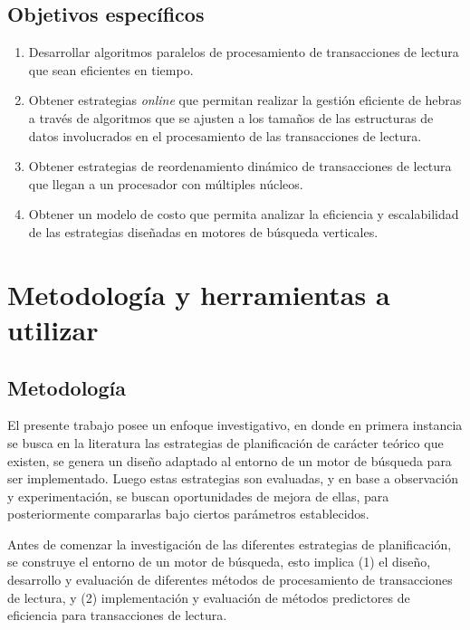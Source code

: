 \subsection{Objetivos específicos}
\label{intro:objetivosespecificos}
\begin{enumerate}	
	\item Desarrollar algoritmos paralelos de procesamiento de transacciones de lectura que sean eficientes en tiempo.
	
	\item Obtener estrategias \textit{online} que permitan realizar la gestión eficiente de hebras a través de algoritmos que se ajusten a los tamaños de las estructuras de datos involucrados en el procesamiento de las transacciones de lectura.
    
    \item Obtener estrategias de reordenamiento dinámico de transacciones de lectura que llegan a un procesador con múltiples núcleos.
    
    \item Obtener un modelo de costo que permita analizar la eficiencia y escalabilidad de las estrategias diseñadas en motores de búsqueda verticales.
\end{enumerate}

\section{Metodología y herramientas a utilizar}
\label{intro:metodologiayherramientas}

\subsection{Metodología}
\label{intro:metodologia}
El presente trabajo posee un enfoque investigativo, en donde en primera instancia se busca en la literatura las estrategias de planificación de carácter teórico que existen, se genera un diseño adaptado al entorno de un motor de búsqueda para ser implementado. Luego estas estrategias son evaluadas, y en base a observación y experimentación, se buscan oportunidades de mejora de ellas, para posteriormente compararlas bajo ciertos parámetros establecidos.

Antes de comenzar la investigación de las diferentes estrategias de planificación, se construye el entorno de un motor de búsqueda, esto implica (1) el diseño, desarrollo y evaluación de diferentes métodos de procesamiento de transacciones de lectura, y (2) implementación y evaluación de métodos predictores de eficiencia para transacciones de lectura.

